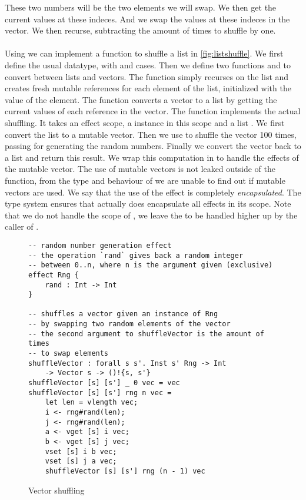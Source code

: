 These two numbers will be the two elements we will swap.
We then get the current values at these indeces.
And we swap the values at these indeces in the vector.
We then recurse, subtracting the amount of times to shuffle by one.
\\\\
Using  we can implement a function to shuffle a list in \cref{fig:listshuffle}.
We first define the usual  datatype, with  and  cases.
Then we define two functions  and  to convert between lists and vectors.
The function  simply recurses on the list and creates fresh mutable references for each element of the list, initialized with the value of the element.
The function  converts a vector to a list by getting the current values of each reference in the vector.
The function  implements the actual shuffling.
It takes an effect scope, a  instance  in this scope and a list .
We first convert the list to a mutable vector.
Then we use  to shuffle the vector 100 times, passing  for generating the random numbers.
Finally we convert the vector back to a list and return this result.
We wrap this computation in  to handle the effects of the mutable vector.
The use of mutable vectors is not leaked outside of the function, from the type and behaviour of  we are unable to find out if mutable vectors are used.
We say that the use of the  effect is completely \emph{encapsulated}.
The type system ensures that  actually does encapsulate all effects in its scope.
Note that we do not handle the scope of , we leave the  to be handled higher up by the caller of .


\begin{figure}[H]
\caption{Vector shuffling}
\begin{verbatim}
-- random number generation effect
-- the operation `rand` gives back a random integer
-- between 0..n, where n is the argument given (exclusive)
effect Rng {
	rand : Int -> Int
}

-- shuffles a vector given an instance of Rng
-- by swapping two random elements of the vector
-- the second argument to shuffleVector is the amount of times
-- to swap elements
shuffleVector : forall s s'. Inst s' Rng -> Int
	-> Vector s -> ()!{s, s'}
shuffleVector [s] [s'] _ 0 vec = vec
shuffleVector [s] [s'] rng n vec =
	let len = vlength vec;
	i <- rng#rand(len);
	j <- rng#rand(len);
	a <- vget [s] i vec;
	b <- vget [s] j vec;
	vset [s] i b vec;
	vset [s] j a vec;
	shuffleVector [s] [s'] rng (n - 1) vec
\end{verbatim}
\label{fig:shuffle}
\end{figure}



